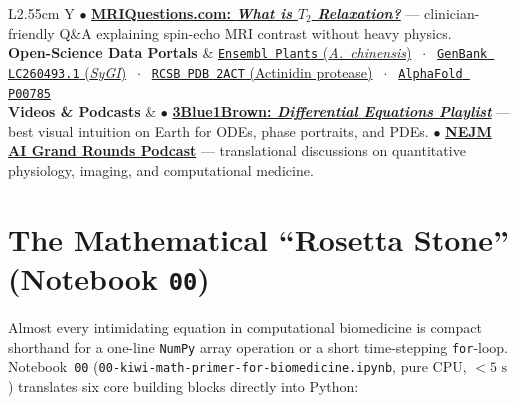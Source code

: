 \documentclass[10.5pt,a4paper]{article}
\begin{document}
\begin{table}[H]
\begin{tabularx}{\textwidth}{L{2.55cm} Y}
$\bullet$ \href{https://mriquestions.com/t2-relaxation.html}{\textbf{MRIQuestions.com: \emph{What is $T_2$ Relaxation?}}} --- clinician-friendly Q\&A explaining spin-echo MRI contrast without heavy physics. \\
\textbf{Open-Science Data Portals} &
\href{https://plants.ensembl.org/Actinidia_chinensis/Info/Index}{\texttt{Ensembl Plants} (\emph{A.\ chinensis})} $\;\cdot\;$
\href{https://www.ncbi.nlm.nih.gov/nuccore/LC260493.1}{\texttt{GenBank LC260493.1} (\emph{SyGI})} $\;\cdot\;$
\href{https://www.rcsb.org/structure/2ACT}{\texttt{RCSB PDB 2ACT} (Actinidin protease)} $\;\cdot\;$
\href{https://alphafold.ebi.ac.uk/entry/P00785}{\texttt{AlphaFold P00785}} \\
\textbf{Videos \& Podcasts} &
$\bullet$ \href{https://www.youtube.com/playlist?list=PLZHQObOWTQDNPOjrT6KVlfJuKtYTtzqH6}{\textbf{3Blue1Brown: \emph{Differential Equations Playlist}}} --- best visual intuition on Earth for ODEs, phase portraits, and PDEs. \newline
$\bullet$ \href{https://ai-podcast.nejm.org/}{\textbf{NEJM AI Grand Rounds Podcast}} --- translational discussions on quantitative physiology, imaging, and computational medicine. \\
\bottomrule
\end{tabularx}
\caption{Curated readings, visual tutorials, open-science portals, videos, and podcasts supporting Notebooks~\texttt{00}, \texttt{00a}, and~\texttt{01}.}
\label{tab:lab5-p1-resources}
\end{table}

\newpage
\section{The Mathematical ``Rosetta Stone'' (Notebook \texttt{00})}
\label{sec:math-primer}

Almost every intimidating equation in computational biomedicine is compact shorthand for a one-line \texttt{NumPy} array operation or a short time-stepping \texttt{for}-loop. Notebook~\texttt{00} (\texttt{00-kiwi-math-primer-for-biomedicine.ipynb}, pure CPU, $<5\text{ s}$) translates six core building blocks directly into Python:
\end{document}
